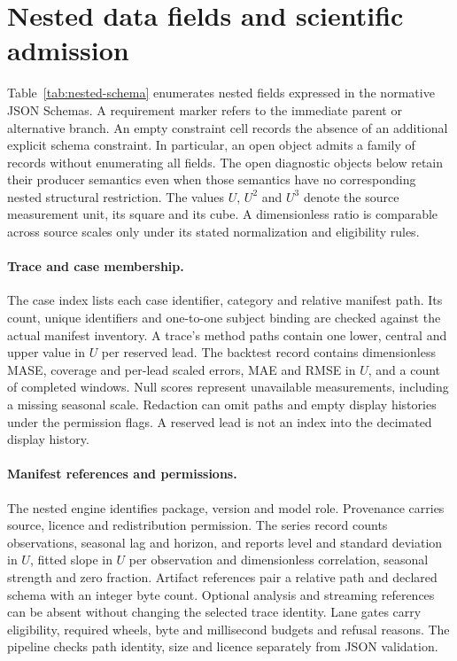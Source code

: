 \section{Nested data fields and scientific admission}
\label{sec:nested-contracts}
Table~\ref{tab:nested-schema} enumerates nested fields expressed in the normative JSON Schemas. A requirement marker refers to the immediate parent or alternative branch. An empty constraint cell records the absence of an additional explicit schema constraint. In particular, an open object admits a family of records without enumerating all fields. The open diagnostic objects below retain their producer semantics even when those semantics have no corresponding nested structural restriction. The values $U$, $U^2$ and $U^3$ denote the source measurement unit, its square and its cube. A dimensionless ratio is comparable across source scales only under its stated normalization and eligibility rules.

\paragraph{Trace and case membership.}
The case index lists each case identifier, category and relative manifest path. Its count, unique identifiers and one-to-one subject binding are checked against the actual manifest inventory. A trace's method paths contain one lower, central and upper value in $U$ per reserved lead. The backtest record contains dimensionless MASE, coverage and per-lead scaled errors, MAE and RMSE in $U$, and a count of completed windows. Null scores represent unavailable measurements, including a missing seasonal scale. Redaction can omit paths and empty display histories under the permission flags. A reserved lead is not an index into the decimated display history.

\paragraph{Manifest references and permissions.}
The nested engine identifies package, version and model role. Provenance carries source, licence and redistribution permission. The series record counts observations, seasonal lag and horizon, and reports level and standard deviation in $U$, fitted slope in $U$ per observation and dimensionless correlation, seasonal strength and zero fraction. Artifact references pair a relative path and declared schema with an integer byte count. Optional analysis and streaming references can be absent without changing the selected trace identity. Lane gates carry eligibility, required wheels, byte and millisecond budgets and refusal reasons. The pipeline checks path identity, size and licence separately from JSON validation.

